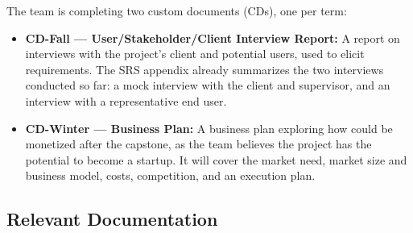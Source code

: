 \documentclass[12pt, titlepage]{article}
\begin{document}
The team is completing two custom documents (CDs), one per term:
\begin{itemize}
  \item \textbf{CD-Fall --- User/Stakeholder/Client Interview Report:} A report on interviews with the project's client and potential users, used to elicit requirements. The SRS appendix already summarizes the two interviews conducted so far: a mock interview with the client and supervisor, and an interview with a representative end user.
  \item \textbf{CD-Winter --- Business Plan:} A business plan exploring how \progname{} could be monetized after the capstone, as the team believes the project has the potential to become a startup. It will cover the market need, market size and business model, costs, competition, and an execution plan.
\end{itemize}

\subsection{Relevant Documentation}
\end{document}
